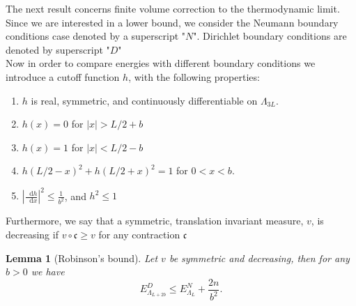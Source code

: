 \documentclass[a4paper,11pt]{article}
\newcommand{\abs}[1]{\left\lvert #1 \right\rvert}
\newcommand*\diff{\mathop{}\!\mathrm{d}}
\newtheorem{lemma}[theorem]{Lemma}
\numberwithin{equation}{section}
\begin{document}
	The next result concerns finite volume correction to the thermodynamic limit. Since we are interested in a lower bound, we consider the Neumann boundary conditions case denoted by a superscript "$ N $". Dirichlet boundary conditions are denoted by superscript "$ D $"\\
	Now in order to compare energies with different boundary conditions we introduce a cutoff function $ h $, with the following properties:\begin{enumerate}
		\item $ h $ is real, symmetric, and continuously differentiable on $ \Lambda_{3L} $.
		\item $ h(x)=0 $ for $ \abs{x}>L/2+b $
		\item $ h(x)=1 $ for $ \abs{x}<L/2-b $
		\item $ h(L/2-x)^2+h(L/2+x)^2=1 $ for $ 0<x<b $.
		\item $ \abs{\frac{\diff h}{\diff x}}^2\leq \frac{1}{b^2} $, and $ h^2\leq 1 $
	\end{enumerate}
	Furthermore, we say that a symmetric, translation invariant measure, $ v $, is decreasing if $ v\circ \mathfrak{c}\geq v $ for any contraction $ \mathfrak{c} $
	\begin{lemma}[Robinson's bound]\label{LemmaRobinson}
		Let $ v$ be symmetric and decreasing, then for any $ b>0 $ we have \begin{equation}\label{EqRobinsonBound}
		E^D_{\Lambda_{L+2b}}\leq E^N_{\Lambda_L}+\frac{2n}{b^2}.
		\end{equation}
	\end{lemma}
\end{document}
